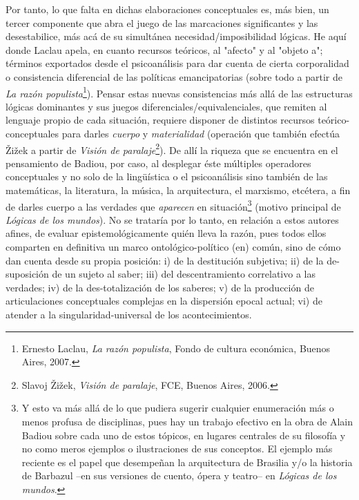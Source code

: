 \documentclass{book}
\begin{document}
Por tanto, lo que falta en dichas elaboraciones conceptuales es, más
bien, un tercer componente que abra el juego de las marcaciones
significantes y las desestabilice, más acá de su simultánea
necesidad/imposibilidad lógicas. He aquí donde Laclau apela, en cuanto
recursos teóricos, al "afecto" y al "objeto a"; términos exportados
desde el psicoanálisis para dar cuenta de cierta corporalidad o
consistencia diferencial de las políticas emancipatorias (sobre todo a
partir de \emph{La razón populista}\footnote{Ernesto Laclau, \emph{La
  razón populista}, Fondo de cultura económica, Buenos Aires, 2007.}).
Pensar estas nuevas consistencias más allá de las estructuras lógicas
dominantes y sus juegos diferenciales/equivalenciales, que remiten al
lenguaje propio de cada situación, requiere disponer de distintos
recursos teórico-conceptuales para darles \emph{cuerpo} y
\emph{materialidad} (operación que también efectúa Žižek a partir de
\emph{Visión de paralaje}\footnote{Slavoj Žižek, \emph{Visión de
  paralaje}, FCE, Buenos Aires, 2006.}). De allí la riqueza que se
encuentra en el pensamiento de Badiou, por caso, al desplegar éste
múltiples operadores conceptuales y no solo de la lingüística o el
psicoanálisis sino también de las matemáticas, la literatura, la música,
la arquitectura, el marxismo, etcétera, a fin de darles cuerpo a las
verdades que \emph{aparecen} en situación\footnote{Y esto va más allá de
  lo que pudiera sugerir cualquier enumeración más o menos profusa de
  disciplinas, pues hay un trabajo efectivo en la obra de Alain Badiou
  sobre cada uno de estos tópicos, en lugares centrales de su filosofía
  y no como meros ejemplos o ilustraciones de sus conceptos. El ejemplo
  más reciente es el papel que desempeñan la arquitectura de Brasilia
  y/o la historia de Barbazul --en sus versiones de cuento, ópera y
  teatro-- en \emph{Lógicas de los mundos}.} (motivo principal de
\emph{Lógicas de los mundos}). No se trataría por lo tanto, en relación
a estos autores afines, de evaluar epistemológicamente quién lleva la
razón, pues todos ellos comparten en definitiva un marco
ontológico-político (en) común, sino de cómo dan cuenta desde su propia
posición: i) de la destitución subjetiva; ii) de la de-suposición de un
sujeto al saber; iii) del descentramiento correlativo a las verdades;
iv) de la des-totalización de los saberes; v) de la producción de
articulaciones conceptuales complejas en la dispersión epocal actual;
vi) de atender a la singularidad-universal de los acontecimientos.
\end{document}

